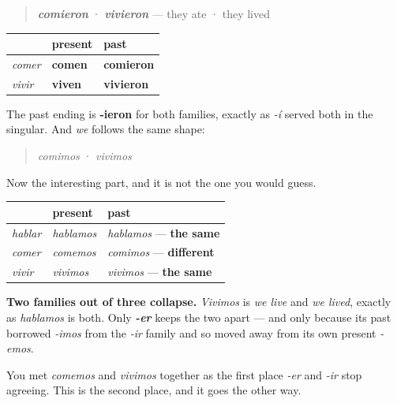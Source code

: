 \begin{grammarlens}[title={Grammar Lens: one ending, two families}]
\begin{quote}
\emph{\textbf{comieron}} · \emph{\textbf{vivieron}} — they ate · they lived
\end{quote}

\noindent
\begin{tabularx}{\linewidth}{@{}>{\raggedright\arraybackslash}X>{\raggedright\arraybackslash}X>{\raggedright\arraybackslash}X@{}}
\toprule
\textbf{} & \textbf{present} & \textbf{past} \\
\midrule
\emph{comer} & \textbf{comen} & \textbf{comieron} \\
\emph{vivir} & \textbf{viven} & \textbf{vivieron} \\
\bottomrule
\end{tabularx}

The past ending is \textbf{-ieron} for both families, exactly as \emph{-í} served both in the singular. And \emph{we} follows the same shape:

\begin{quote}
\emph{comimos} · \emph{vivimos}
\end{quote}

Now the interesting part, and it is not the one you would guess.

\noindent
\begin{tabularx}{\linewidth}{@{}>{\raggedright\arraybackslash}X>{\raggedright\arraybackslash}X>{\raggedright\arraybackslash}X@{}}
\toprule
\textbf{} & \textbf{present} & \textbf{past} \\
\midrule
\emph{hablar} & \emph{hablamos} & \emph{hablamos} — \textbf{the same} \\
\emph{comer} & \emph{comemos} & \emph{comimos} — \textbf{different} \\
\emph{vivir} & \emph{vivimos} & \emph{vivimos} — \textbf{the same} \\
\bottomrule
\end{tabularx}

\textbf{Two families out of three collapse.} \emph{Vivimos} is \emph{we live} and \emph{we lived}, exactly as \emph{hablamos} is both. Only \emph{\textbf{-er}} keeps the two apart — and only because its past borrowed \emph{-imos} from the \emph{-ir} family and so moved away from its own present \emph{-emos}.

You met \emph{comemos} and \emph{vivimos} together as the first place \emph{-er} and \emph{-ir} stop agreeing. This is the second place, and it goes the other way.
\end{grammarlens}

